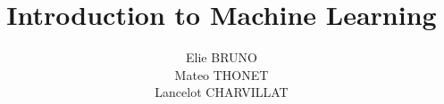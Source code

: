 \documentclass[9pt]{extarticle}
\title{Introduction to Machine Learning}
\author{Elie BRUNO \\ Mateo THONET \\ Lancelot CHARVILLAT}
\begin{document}

\tableofcontents
\newpage
%
\twocolumn


\onecolumn
% 

\end{document}
